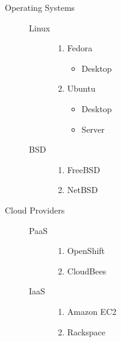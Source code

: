 \begin{description}
\item[Operating Systems]\begin{description}
\item[Linux]\begin{enumerate}
\item Fedora
\begin{itemize}
\item Desktop
\end{itemize}
\item Ubuntu
\begin{itemize}
\item Desktop
\item Server
\end{itemize}
\end{enumerate}
\item[BSD]\begin{enumerate}
\item FreeBSD
\item NetBSD
\end{enumerate}
\end{description}
\item[Cloud Providers]\begin{description}
\item[PaaS]\begin{enumerate}
\item OpenShift
\item CloudBees
\end{enumerate}
\item[IaaS]\begin{enumerate}
\item Amazon EC2
\item Rackspace
\end{enumerate}
\end{description}
\end{description}
